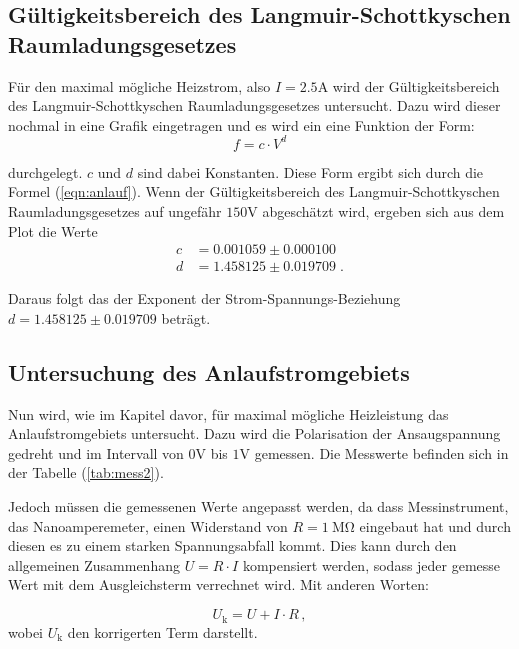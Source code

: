\subsection{Gültigkeitsbereich des Langmuir-Schottkyschen Raumladungsgesetzes}

Für den maximal mögliche Heizstrom, also $I = 2.5 \si{\ampere}$ wird der Gültigkeitsbereich des Langmuir-Schottkyschen Raumladungsgesetzes untersucht. Dazu wird dieser nochmal in eine 
Grafik eingetragen und es wird ein eine Funktion der Form:
\begin{equation*}
    f = c \cdot V^d    
\end{equation*}

durchgelegt. $c$ und $d$ sind dabei Konstanten. Diese Form ergibt sich durch die Formel (\ref{eqn:anlauf}). Wenn der Gültigkeitsbereich des Langmuir-Schottkyschen Raumladungsgesetzes
auf ungefähr $150 \si{\volt} $ abgeschätzt wird, ergeben sich aus dem Plot die Werte
\begin{align*}
    c &= 0.001059 \pm 0.000100 \\
    d &= 1.458125 \pm 0.019709 \; .
\end{align*}

Daraus folgt das der Exponent der Strom-Spannungs-Beziehung $d = 1.458125 \pm 0.019709$ beträgt.

\subsection{Untersuchung des Anlaufstromgebiets}
Nun wird, wie im Kapitel davor, für maximal mögliche Heizleistung das Anlaufstromgebiets untersucht. Dazu wird die Polarisation der Ansaugspannung gedreht und im Intervall von
$0 \si{\volt} $ bis $1 \si{\volt} $ gemessen. Die Messwerte befinden sich in der Tabelle (\ref{tab:mess2}).

Jedoch müssen die gemessenen Werte angepasst werden, da dass Messinstrument, das Nanoamperemeter, einen Widerstand von $R = \SI{1}{\mega\ohm}$
eingebaut hat und durch diesen es zu einem starken Spannungsabfall kommt. Dies kann durch den allgemeinen Zusammenhang $ U = R \cdot I$ kompensiert werden, sodass jeder gemesse Wert 
mit dem Ausgleichsterm verrechnet wird. Mit anderen Worten:

\begin{equation*}
    U_\text{k} = U + I \cdot R \, ,  
\end{equation*}
wobei $U_\text{k}$ den korrigerten Term darstellt. 

